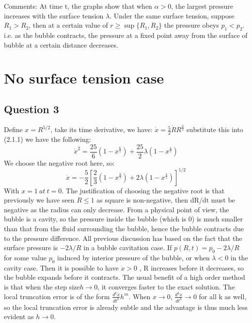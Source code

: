 \documentclass[11pt]{article}
\begin{document}
Comments: At time t, the graphs show that when 
$ \alpha > 0$, the largest pressure increases with the surface tension $ \lambda $. Under the same surface tension, suppose $R_{1}>R_{2}$, then at a certain value of $r \geqslant \sup\lbrace{R_{1}, R_{2}\rbrace}$ the pressure obeys $p_{1}<p_{2}$. i.e. as the bubble contracts, the pressure at a fixed point away from the surface of bubble at a certain distance decreases.
\section{No surface tension case}
\subsection{Question 3}
Define $x = R^{5/2}$, take its time derivative, we have: $\dot{x} = \frac{5}{2}\dot{R}R^{\frac{3}{2}}$ 
substitute this into (2.1.1) we have the following:
$$\dot{x}^2 = \frac{25}{6}(1-x^{\frac{6}{5}})+\frac{25}{2}\lambda(1-x^{\frac{4}{5}})$$
We choose the negative root here, so: 
\begin{equation*}
\dot{x} = -\frac{5}{2}\left[\frac{2}{3}\left(1-x^{\frac{6}{5}}\right)+2\lambda\left(1-x^{\frac{4}{5}}\right)\right]^{1/2} \tag{3.1.1}
\end{equation*}
With $x=1\ at\ t=0$.
The justification of choosing the negative root is that previously we have seen $R\leqslant 1$ as square is non-negative, then dR/dt must be negative as the radius can only decrease. \newline\newline
From a physical point of view, the bubble is a cavity, so the pressure inside the bubble (which is 0) is much smaller than that from the fluid surrounding the bubble, hence the bubble contracts due to the pressure difference.\newline\newline
All previous discussion has based on the fact that the surface pressure is $-2\lambda/R$ in a bubble cavitation case. If $p(R,t) = p_{0} - 2\lambda/R$ for some value $p_{0}$ induced by interior pressure of the bubble, or when $\lambda < 0$ in the cavity case. Then it is possible to have $\dot{x}>0$ , R increases before it decreases, so the bubble expands before it contracts.
\newline\newline
The usual benefit of a high order method is that when the step size$h \to 0 $, it converges faster to the exact solution. The local truncation error is of the form $\frac{d^{k}x}{dt^{k}}h^m$. When $x\to 0$, $\frac{d^{k}x}{dt^{k}} \to 0$ for all k as well, so the local truncation error is already subtle and the advantage is thus much less evident as $h \to 0$.
\end{document}
